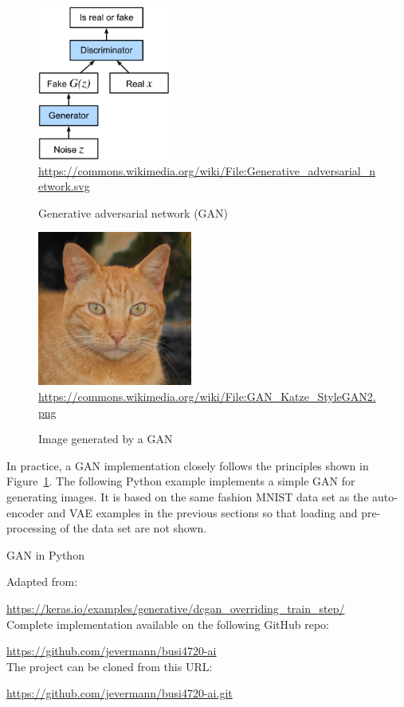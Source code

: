 \begin{figure}
\begin{center}
\includegraphics[height=2in]{Generative_adversarial_network.svg.png}\\

\scriptsize \url{https://commons.wikimedia.org/wiki/File:Generative_adversarial_network.svg} \normalsize
\end{center}
\caption{Generative adversarial network (GAN)}
\label{fig:gan}
\end{figure}

\begin{figure}
\begin{center}
\includegraphics[height=2in]{GAN_Katze_StyleGAN2.png} \\

\scriptsize \url{https://commons.wikimedia.org/wiki/File:GAN_Katze_StyleGAN2.png} \normalsize
\end{center}
\caption{Image generated by a GAN}
\label{fig:gancat}
\end{figure}

In practice, a GAN implementation closely follows the principles shown in Figure~\ref{fig:gan}. The following Python example implements a simple GAN for generating images. It is based on the same fashion MNIST data set as the auto-encoder and VAE examples in the previous sections so that loading and pre-processing of the data set are not shown.

\begin{resourcebox}{GAN in Python}

Adapted from: 

\small\url{https://keras.io/examples/generative/dcgan_overriding_train_step/}\normalsize \\

Complete implementation available on the following GitHub repo:

\small\url{https://github.com/jevermann/busi4720-ai}\normalsize \\

The project can be cloned from this URL:

\small\url{https://github.com/jevermann/busi4720-ai.git}\normalsize
\end{resourcebox}

